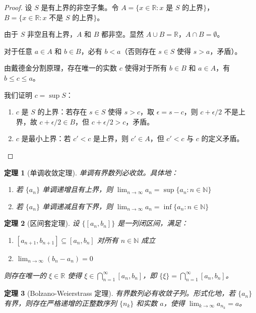 \documentclass[12pt]{article}
\newtheorem{theorem}{定理}[section]
\begin{document}
\begin{proof}
设 $S$ 是有上界的非空子集。令 $A = \{x \in \mathbb{R} : x \text{ 是 } S \text{ 的上界}\}$，$B = \{x \in \mathbb{R} : x \text{ 不是 } S \text{ 的上界}\}$。

由于 $S$ 非空且有上界，$A$ 和 $B$ 都非空。显然 $A \cup B = \mathbb{R}$，$A \cap B = \emptyset$。

对于任意 $a \in A$ 和 $b \in B$，必有 $b < a$（否则存在 $s \in S$ 使得 $s > a$，矛盾）。

由戴德金分割原理，存在唯一的实数 $c$ 使得对于所有 $b \in B$ 和 $a \in A$，有 $b \leq c \leq a$。

我们证明 $c = \sup S$：
\begin{enumerate}
\item $c$ 是 $S$ 的上界：若存在 $s \in S$ 使得 $s > c$，取 $\epsilon = s - c$，则 $c + \epsilon/2$ 不是上界，故 $c + \epsilon/2 \in B$，但 $c + \epsilon/2 > c$，矛盾。
\item $c$ 是最小上界：若 $c' < c$ 是上界，则 $c' \in A$，但 $c' < c$ 与 $c$ 的定义矛盾。
\end{enumerate}
\end{proof}

\begin{theorem}[单调收敛定理]
单调有界数列必收敛。具体地：
\begin{enumerate}
\item 若 $\{a_n\}$ 单调递增且有上界，则 $\lim_{n \to \infty} a_n = \sup\{a_n : n \in \mathbb{N}\}$
\item 若 $\{a_n\}$ 单调递减且有下界，则 $\lim_{n \to \infty} a_n = \inf\{a_n : n \in \mathbb{N}\}$
\end{enumerate}
\end{theorem}

\begin{theorem}[区间套定理]
设 $\{[a_n, b_n]\}$ 是一列闭区间，满足：
\begin{enumerate}
\item $[a_{n+1}, b_{n+1}] \subseteq [a_n, b_n]$ 对所有 $n \in \mathbb{N}$ 成立
\item $\lim_{n \to \infty} (b_n - a_n) = 0$
\end{enumerate}
则存在唯一的 $\xi \in \mathbb{R}$ 使得 $\xi \in \bigcap_{n=1}^{\infty} [a_n, b_n]$，即 $\{\xi\} = \bigcap_{n=1}^{\infty} [a_n, b_n]$。
\end{theorem}

\begin{theorem}[Bolzano-Weierstrass 定理]
有界数列必有收敛子列。形式化地，若 $\{a_n\}$ 有界，则存在严格递增的正整数序列 $\{n_k\}$ 和实数 $a$，使得 $\lim_{k \to \infty} a_{n_k} = a$。
\end{theorem}
\end{document}
